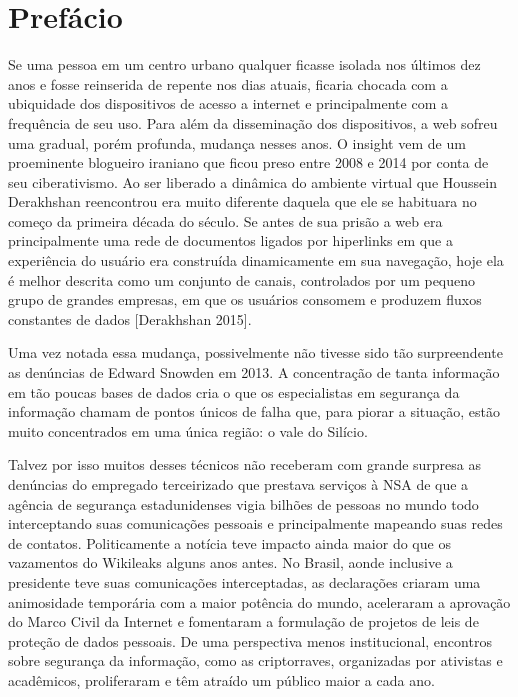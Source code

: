 

\chapter{Prefácio}\label{prefuxe1cio}

Se uma pessoa em um centro urbano qualquer ficasse isolada nos últimos
dez anos e fosse reinserida de repente nos dias atuais, ficaria chocada
com a ubiquidade dos dispositivos de acesso a internet e principalmente
com a frequência de seu uso. Para além da disseminação dos dispositivos,
a web sofreu uma gradual, porém profunda, mudança nesses anos. O insight
vem de um proeminente blogueiro iraniano que ficou preso entre 2008 e
2014 por conta de seu ciberativismo. Ao ser liberado a dinâmica do
ambiente virtual que Houssein Derakhshan reencontrou era muito diferente
daquela que ele se habituara no começo da primeira década do século. Se
antes de sua prisão a web era principalmente uma rede de documentos
ligados por hiperlinks em que a experiência do usuário era construída
dinamicamente em sua navegação, hoje ela é melhor descrita como um
conjunto de canais, controlados por um pequeno grupo de grandes
empresas, em que os usuários consomem e produzem fluxos constantes de
dados {[}Derakhshan 2015{]}.

Uma vez notada essa mudança, possivelmente não tivesse sido tão
surpreendente as denúncias de Edward Snowden em 2013. A concentração de
tanta informação em tão poucas bases de dados cria o que os
especialistas em segurança da informação chamam de pontos únicos de
falha que, para piorar a situação, estão muito concentrados em uma única
região: o vale do Silício.

Talvez por isso muitos desses técnicos não receberam com grande surpresa
as denúncias do empregado terceirizado que prestava serviços à NSA de
que a agência de segurança estadunidenses vigia bilhões de pessoas no
mundo todo interceptando suas comunicações pessoais e principalmente
mapeando suas redes de contatos. Politicamente a notícia teve impacto
ainda maior do que os vazamentos do Wikileaks alguns anos antes. No
Brasil, aonde inclusive a presidente teve suas comunicações
interceptadas, as declarações criaram uma animosidade temporária com a
maior potência do mundo, aceleraram a aprovação do Marco Civil da
Internet e fomentaram a formulação de projetos de leis de proteção de
dados pessoais. De uma perspectiva menos institucional, encontros sobre
segurança da informação, como as criptorraves, organizadas por ativistas
e acadêmicos, proliferaram e têm atraído um público maior a cada ano.

